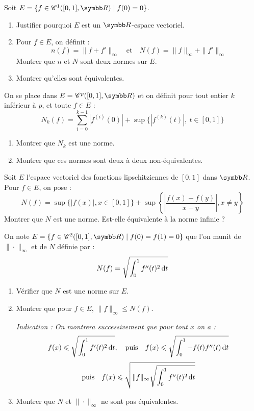 \begin{exercice}
    Soit $E = \{ f \in \mathscr C^1([0,1], \R) \mid f(0)=0 \}$.
    \begin{enumerate}
        \item Justifier pourquoi $E$ est un $\R$-espace vectoriel.
        \item Pour $f \in E$, on définit :
            \[n(f) = \|f+f'\|_\infty \quad \text{et} \quad N(f) = \|f\|_\infty + \|f'\|_\infty\]
            Montrer que $n$ et $N$ sont deux normes sur $E$.
        \item Montrer qu'elles sont équivalentes.
    \end{enumerate}
\end{exercice}

\begin{exercice}
    On se place dans $E = \mathscr C^p([0,1], \R)$ et on définit pour tout entier $k$ inférieur à $p$, et toute $f \in E$ :
    \[N_k(f) = \sum_{i=0}^{k-1} |f^{(i)}(0)| + \sup \{ |f^{(k)}(t)|, \ t \in [0,1] \}\]
    \begin{enumerate}
        \item Montrer que $N_k$ est une norme.
        \item Montrer que ces normes sont deux à deux non-équivalentes.
    \end{enumerate}
\end{exercice}

\begin{exercice}
    Soit $E$ l'espace vectoriel des fonctions lipschitziennes de $[0,1]$ dans $\R$. Pour $f \in E$, on pose :
    \[N(f) = \sup \{ |f(x)|, x \in [0,1] \} + \sup \left\{ \left| \frac{f(x)-f(y)}{x-y} \right|, x \ne y \right\}\]
    Montrer que $N$ est une norme. Est-elle équivalente à la norme infinie ?
\end{exercice}

\begin{exercice}
    On note $E = \{ f \in \mathscr C^2([0,1], \R) \mid f(0)=f(1)=0 \}$ que l'on munit de $\|\cdot\|_\infty$ et de $N$ définie par :
    \[N(f) = \sqrt{\int_0^1 f''(t)^2 \,\mathrm{d}t}\]
    \begin{enumerate}
        \item Vérifier que $N$ est une norme sur $E$.
        \item Montrer que pour $f \in E$, $\|f\|_\infty \leqslant N(f)$.
        
            \textit{Indication : On montrera successivement que pour tout $x$ on a :}
            \[f(x) \leqslant \sqrt{\int_0^1 f'(t)^2 \,\mathrm{d}t}, \quad \text{puis} \quad f(x) \leqslant \sqrt{\int_0^1 -f(t)f''(t) \,\mathrm{d}t}\]
            \[\text{puis} \quad f(x) \leqslant \sqrt{\|f\|_\infty \sqrt{\int_0^1 f''(t)^2 \,\mathrm{d}t}}\]
        \item Montrer que $N$ et $\|\cdot\|_\infty$ ne sont pas équivalentes.
    \end{enumerate}
\end{exercice}

